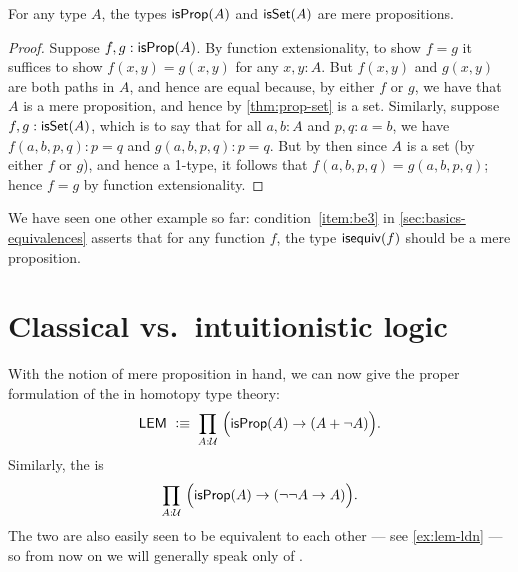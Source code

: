 \begin{lem}\label{thm:isprop-isprop}\label{thm:isprop-isset}
  For any type $A$, the types $\mathsf{isProp}(A)$ and $\mathsf{isSet}(A)$ are mere propositions.
\end{lem}
\begin{proof}
  Suppose $f,g:\mathsf{isProp}(A)$.  By function extensionality, to show $f=g$ it
  suffices to show $f(x,y)=g(x,y)$ for any $x,y:A$.  But $f(x,y)$ and $g(x,y)$
  are both paths in $A$, and hence are equal because, by either $f$ or $g$, we
  have that $A$ is a mere proposition, and hence by \cref{thm:prop-set} is a
  set.  Similarly, suppose $f,g:\mathsf{isSet}(A)$, which is to say that for all
  $a,b:A$ and $p,q:a=b$, we have $f(a,b,p,q):p=q$ and $g(a,b,p,q):p=q$.  But by then since $A$ is a set (by
  either $f$ or $g$), and hence a 1-type, it follows that $f(a,b,p,q)=g(a,b,p,q)$; hence $f=g$ by
  function extensionality.
\end{proof}

We have seen one other example so far: condition~\ref{item:be3} in \cref{sec:basics-equivalences} asserts that for any function $f$, the type $\mathsf{isequiv} (f)$ should be a mere proposition.

%
%

\section{Classical vs.\ intuitionistic logic}
\label{sec:intuitionism}

%
%
With the notion of mere proposition in hand, we can now give the proper formulation of the 
%
%
%
in homotopy type theory:
\begin{equation}
  \label{eq:lem}
  \LEM{}\;\defeq\;
  \prd{A:\UU} \Big(\isprop(A) \to (A + \neg A)\Big).
\end{equation}
Similarly, the 
%
%
%
is
\begin{equation}
  \label{eq:ldn}
  \prd{A:\UU} \Big(\isprop(A) \to (\neg\neg A \to A)\Big).
\end{equation}
The two are also easily seen to be equivalent to each other --- see \cref{ex:lem-ldn} --- so from now on we will generally speak only of \LEM{}.

